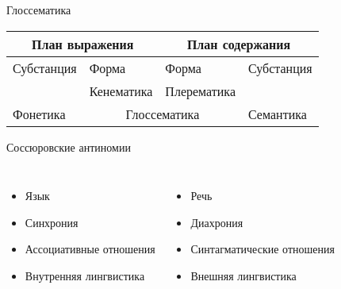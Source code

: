 \begin{frame}{Глоссематика}
    \begin{table}[t]
        \begin{tabularx}{\textwidth}{XXXX}
            \multicolumn{2}{c}{План выражения} & \multicolumn{2}{c}{План содержания} \\ \midrule
            Субстанция & Форма & Форма & Субстанция \\ \midrule
            & Кенематика & Плерематика & \\ \midrule
            Фонетика & \multicolumn{2}{c}{Глоссематика} & Семантика \\
        \end{tabularx}
    \end{table}
\end{frame}

\begin{frame}{Соссюровские антиномии}
    \begin{columns}
        \begin{itemize}
            \item Язык
            \item Синхрония
            \item Ассоциативные отношения
            \item Внутренняя лингвистика
        \end{itemize}

        \begin{itemize}
            \item Речь
            \item Диахрония
            \item Синтагматические отношения
            \item Внешняя лингвистика
        \end{itemize}
    \end{columns}
\end{frame}


